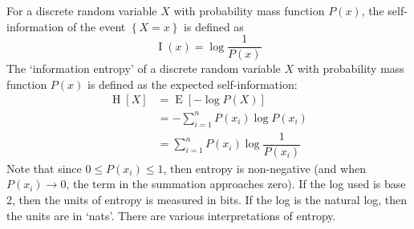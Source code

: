 \documentclass[11pt]{report} %
\begin{document}
For a discrete random variable $X$ with probability mass function $P\left(x\right)$, the self-information of the event $\left\{X = x\right\}$ is defined as
\begin{equation}
\operatorname{I}\left(x\right) = \log\dfrac{1}{P\left(x\right)}
\end{equation}
The `information entropy' of a discrete random variable $X$ with probability mass function $P\left(x\right)$ is defined as the expected self-information:
\begin{align}
\operatorname{H}\left[X\right] &= \operatorname{E}\left[-\log P\left(X\right)\right] \\
&= -\sum_{i = 1}^{n}P\left(x_{i}\right)\log P\left(x_{i}\right) \\
&= \sum_{i = 1}^{n}P\left(x_{i}\right)\log \dfrac{1}{P\left(x_{i}\right)}
\end{align}
Note that since $0 \leq P\left(x_{i}\right) \leq 1$, then entropy is non-negative (and when $P\left(x_{i}\right) \rightarrow 0$, the term in the summation approaches zero). If the log used is base 2, then the units of entropy is measured in bits. If the log is the natural log, then the units are in `nats'. There are various interpretations of entropy.
\end{document}
